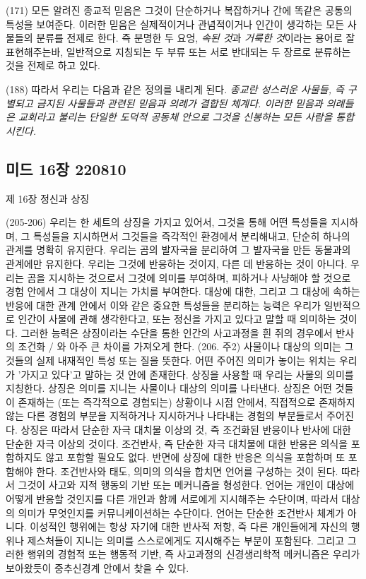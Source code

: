 \documentclass[12pt, a4paper]{article}
\begin{document}
(171) 모든 알려진 종교적 믿음은 그것이 단순하거나 복잡하거나 간에 똑같은 공통의 특성을 보여준다. 이러한 믿음은 실제적이거나 관념적이거나 인간이 생각하는 모든 사물들의 분류를 전제로 한다. 즉 분명한 두 요엉, \emph{속된 것}과 \emph{거룩한 것}이라는 용어로 잘 표현해주는바, 일반적으로 지칭되는 두 부류 또는 서로 반대되는 두 장르로 분류하는 것을 전제로 하고 있다.

(188) 따라서 우리는 다음과 같은 정의를 내리게 된다. \emph{종교란 성스러운 사물들, 즉 구별되고 금지된 사물들과 관련된 믿음과 의례가 결합된 체계다. 이러한 믿음과 의례들은 교회라고 불리는 단일한 도덕적 공동체 안으로 그것을 신봉하는 모든 사람을 통합시킨다.}
\newpage
\subsection{미드 16장 220810}
제 16장 정신과 상징

(205-206) 우리는 한 세트의 상징을 가지고 있어서, 그것을 통해 어떤 특성들을 지시하며, 그 특성들을 지시하면서 그것들을 즉각적인 환경에서 분리해내고, 단순히 하나의 관계를 명확히 유지한다. 우리는 곰의 발자국을 분리하여 그 발자국을 만든 동물과의 관계에만 유지한다. 우리는 그것에 반응하는 것이지, 다른 데 반응하는 것이 아니다. 우리는 곰을 지시하는 것으로서 그것에 의미를 부여하며, 피하거나 사냥해야 할 것으로 경험 안에서 그 대상이 지니는 가치를 부여한다. 대상에 대한, 그리고 그 대상에 속하는 반응에 대한 관계 안에서 이와 같은 중요한 특성들을 분리하는 능력은 우리가 일반적으로 인간이 사물에 관해 생각한다고, 또는 정신을 가지고 있다고 말할 때 의미하는 것이다. 그러한 능력은 상징이라는 수단을 통한 인간의 사고과정을 흰 쥐의 경우에서 반사의 조건화 / 와 아주 큰 차이를 가져오게 한다.
(206. 주2) 사물이나 대상의 의미는 그것들의 실제 내재적인 특성 또는 질을 뜻한다. 어떤 주어진 의미가 놓이는 위치는 우리가 '가지고 있다'고 말하는 것 안에 존재한다. 상징을 사용할 때 우리는 사물의 의미를 지칭한다. 상징은 의미를 지니는 사물이나 대상의 의미를 나타낸다. 상징은 어떤 것들이 존재하는 (또는 즉각적으로 경험되는) 상황이나 시점 안에서, 직접적으로 존재하지 않는 다른 경험의 부분을 지적하거나 지시하거나 나타내는 경험의 부분들로서 주어진다. 상징은 따라서 단순한 자극 대치물 이상의 것, 즉 조건화된 반응이나 반사에 대한 단순한 자극 이상의 것이다. 조건반사, 즉 단순한 자극 대치물에 대한 반응은 의식을 포함하지도 않고 포함할 필요도 없다. 반면에 상징에 대한 반응은 의식을 포함하며 또 포함해야 한다. 조건반사와 태도, 의미의 의식을 합치면 언어를 구성하는 것이 된다. 따라서 그것이 사고와 지적 행동의 기반 또는 메커니즘을 형성한다. 언어는 개인이 대상에 어떻게 반응할 것인지를 다른 개인과 함께 서로에게 지시해주는 수단이며, 따라서 대상의 의미가 무엇인지를 커뮤니케이션하는 수단이다. 언어는 단순한 조건반사 체계가 아니다. 이성적인 행위에는 항상 자기에 대한 반사적 저항, 즉 다른 개인들에게 자신의 행위나 제스처들이 지니는 의미를 스스로에게도 지시해주는 부분이 포함된다. 그리고 그러한 행위의 경험적 또는 행동적 기반, 즉 사고과정의 신경생리학적 메커니즘은 우리가 보아왔듯이 중추신경계 안에서 찾을 수 있다.
\end{document}
